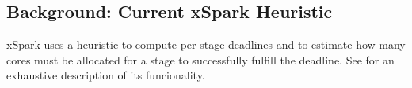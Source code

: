 \subsection{Background: Current xSpark Heuristic}\label{sec:impl_background}

xSpark uses a heuristic to compute per-stage deadlines and to estimate how many cores must be allocated for a stage to successfully fulfill the deadline. See  for an exhaustive description of its funcionality.


